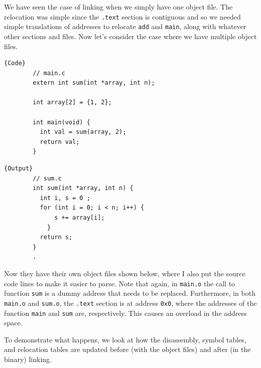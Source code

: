 \documentclass{article}
\begin{document}
      We have seen the case of linking when we simply have one object file. The relocation was simple since the \texttt{.text} section is contiguous and so we needed simple translations of addresses to relocate \texttt{add} and \texttt{main}, along with whatever other sections and files. Now let's consider the case where we have multiple object files.

      \noindent\begin{minipage}{.50\textwidth}
      \begin{lstlisting}[]{Code}
        // main.c
        extern int sum(int *array, int n); 

        int array[2] = {1, 2};

        int main(void) {
          int val = sum(array, 2); 
          return val; 
        }
      \end{lstlisting}
      \end{minipage}
      \hfill
      \begin{minipage}{.49\textwidth}
      \begin{lstlisting}[]{Output}
        // sum.c
        int sum(int *array, int n) {
          int i, s = 0 ; 
          for (int i = 0; i < n; i++) {
              s += array[i];
            }
          return s;
        }
        .
      \end{lstlisting}
      \end{minipage}

      Now they have their own object files shown below, where I also put the source code lines to make it easier to parse. Note that again, in \texttt{main.o} the call to function \texttt{sum} is a dummy address that needs to be replaced. Furthermore, in both \texttt{main.o} and \texttt{sum.o}, the \texttt{.text} section is at address \texttt{0x0}, where the addresses of the function \texttt{main} and \texttt{sum} are, respectively. This causes an overload in the address space. 

      To demonstrate what happens, we look at how the disassembly, symbol tables, and relocation tables are updated before (with the object files) and after (in the binary) linking.  
\end{document}
